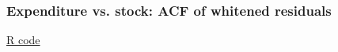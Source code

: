 \documentclass[handout]{beamer}
\begin{document}


   \begin{frame}
   \frametitle{Expenditure vs. stock: ACF of whitened residuals}
   \begin{center}
   \end{center}
   \href{http://stats191.stanford.edu/correlated_errors.html#consumer-expenditure}{R code}
   \end{frame}


   \begin{frame} 

   \end{frame}

   
\end{document}
